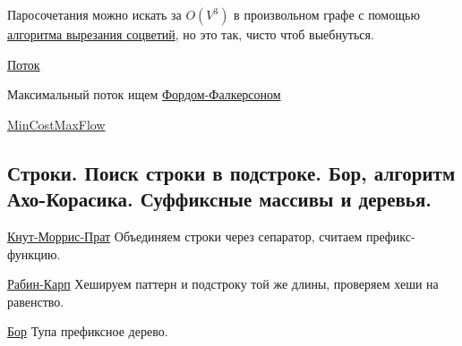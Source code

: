 \documentclass{article}
\begin{document}
Паросочетания можно искать за $O(V^3)$ в произвольном графе с помощью \href{https://neerc.ifmo.ru/wiki/index.php?title=%D0%90%D0%BB%D0%B3%D0%BE%D1%80%D0%B8%D1%82%D0%BC_%D0%B2%D1%8B%D1%80%D0%B5%D0%B7%D0%B0%D0%BD%D0%B8%D1%8F_%D1%81%D0%BE%D1%86%D0%B2%D0%B5%D1%82%D0%B8%D0%B9}{алгоритма вырезания соцветий}, но это так, чисто чтоб выебнуться.

\href{https://neerc.ifmo.ru/wiki/index.php?title=%D0%9E%D0%BF%D1%80%D0%B5%D0%B4%D0%B5%D0%BB%D0%B5%D0%BD%D0%B8%D0%B5_%D1%81%D0%B5%D1%82%D0%B8,_%D0%BF%D0%BE%D1%82%D0%BE%D0%BA%D0%B0}{Поток}

Максимальный поток ищем \href{https://neerc.ifmo.ru/wiki/index.php?title=%D0%90%D0%BB%D0%B3%D0%BE%D1%80%D0%B8%D1%82%D0%BC_%D0%A4%D0%BE%D1%80%D0%B4%D0%B0-%D0%A4%D0%B0%D0%BB%D0%BA%D0%B5%D1%80%D1%81%D0%BE%D0%BD%D0%B0,_%D1%80%D0%B5%D0%B0%D0%BB%D0%B8%D0%B7%D0%B0%D1%86%D0%B8%D1%8F_%D1%81_%D0%BF%D0%BE%D0%BC%D0%BE%D1%89%D1%8C%D1%8E_%D0%BF%D0%BE%D0%B8%D1%81%D0%BA%D0%B0_%D0%B2_%D0%B3%D0%BB%D1%83%D0%B1%D0%B8%D0%BD%D1%83}{Фордом-Фалкерсоном}

\href{https://neerc.ifmo.ru/wiki/index.php?title=%D0%9F%D0%BE%D1%82%D0%BE%D0%BA_%D0%BC%D0%B8%D0%BD%D0%B8%D0%BC%D0%B0%D0%BB%D1%8C%D0%BD%D0%BE%D0%B9_%D1%81%D1%82%D0%BE%D0%B8%D0%BC%D0%BE%D1%81%D1%82%D0%B8}{MinCostMaxFlow}


\subsection{Строки. Поиск строки в подстроке. Бор, алгоритм Ахо-Корасика. Суффиксные массивы и деревья.}

\href{https://neerc.ifmo.ru/wiki/index.php?title=%D0%90%D0%BB%D0%B3%D0%BE%D1%80%D0%B8%D1%82%D0%BC_%D0%9A%D0%BD%D1%83%D1%82%D0%B0-%D0%9C%D0%BE%D1%80%D1%80%D0%B8%D1%81%D0%B0-%D0%9F%D1%80%D0%B0%D1%82%D1%82%D0%B0}{Кнут-Моррис-Прат}
Объединяем строки через сепаратор, считаем префикс-функцию.

\href{https://neerc.ifmo.ru/wiki/index.php?title=%D0%9F%D0%BE%D0%B8%D1%81%D0%BA_%D0%BF%D0%BE%D0%B4%D1%81%D1%82%D1%80%D0%BE%D0%BA%D0%B8_%D0%B2_%D1%81%D1%82%D1%80%D0%BE%D0%BA%D0%B5_%D1%81_%D0%B8%D1%81%D0%BF%D0%BE%D0%BB%D1%8C%D0%B7%D0%BE%D0%B2%D0%B0%D0%BD%D0%B8%D0%B5%D0%BC_%D1%85%D0%B5%D1%88%D0%B8%D1%80%D0%BE%D0%B2%D0%B0%D0%BD%D0%B8%D1%8F._%D0%90%D0%BB%D0%B3%D0%BE%D1%80%D0%B8%D1%82%D0%BC_%D0%A0%D0%B0%D0%B1%D0%B8%D0%BD%D0%B0-%D0%9A%D0%B0%D1%80%D0%BF%D0%B0}{Рабин-Карп}
Хешируем паттерн и подстроку той же длины, проверяем хеши на равенство.

\href{https://neerc.ifmo.ru/wiki/index.php?title=%D0%91%D0%BE%D1%80}{Бор}
Тупа префиксное дерево.
\end{document}
